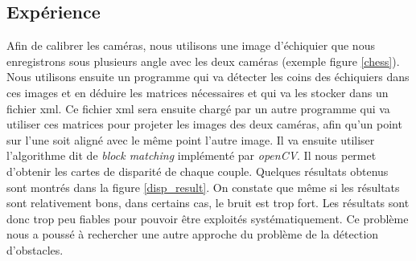 \subsection{Expérience} Afin de calibrer les caméras, nous utilisons une image d'échiquier que nous enregistrons sous plusieurs angle avec les deux caméras (exemple figure \ref{chess}). Nous utilisons ensuite un programme qui va détecter les coins des échiquiers dans ces images et en déduire les matrices nécessaires et qui va les stocker dans un fichier xml. Ce fichier xml sera ensuite chargé par un autre programme qui va utiliser ces matrices pour projeter les images des deux caméras, afin qu'un point sur l'une soit aligné avec le même point l'autre image. Il va ensuite utiliser l'algorithme dit de \emph{block matching} implémenté par \emph{openCV}. Il nous permet d'obtenir les cartes de disparité de chaque couple. Quelques résultats obtenus sont montrés dans la figure \ref{disp_result}. On constate que même si les résultats sont relativement bons, dans certains cas, le bruit est trop fort. Les résultats sont donc trop peu fiables pour pouvoir être exploités systématiquement. Ce problème nous a poussé à rechercher une autre approche du problème de la détection d'obstacles.

